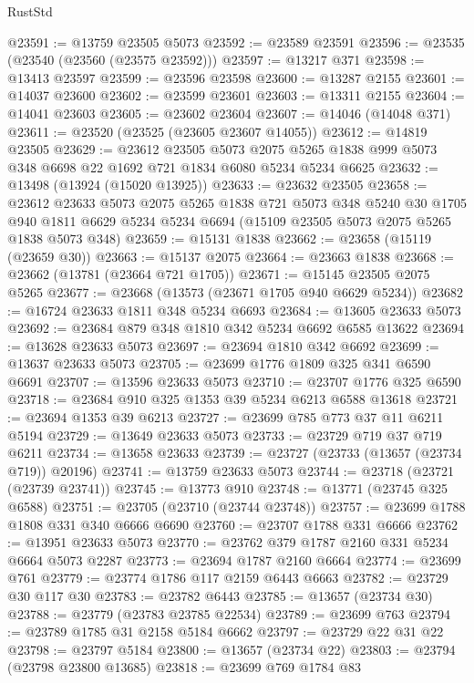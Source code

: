 \begin{lexlean}{RustStd}
\begin{coremodule}
@23591 := @13759 @23505 @5073
@23592 := @23589 @23591
@23596 := @23535 (@23540 (@23560 (@23575 @23592)))
@23597 := @13217 @371
@23598 := @13413 @23597
@23599 := @23596 @23598
@23600 := @13287 @2155
@23601 := @14037 @23600
@23602 := @23599 @23601
@23603 := @13311 @2155
@23604 := @14041 @23603
@23605 := @23602 @23604
@23607 := @14046 (@14048 @371)
@23611 := @23520 (@23525 (@23605 @23607 @14055))
@23612 := @14819 @23505
@23629 := @23612
    @23505
    @5073
    @2075
    @5265
    @1838
    @999
    @5073
    @348
    @6698
    @22
    @1692
    @721
    @1834
    @6080
    @5234
    @5234
    @6625
@23632 := @13498 (@13924 (@15020 @13925))
@23633 := @23632 @23505
@23658 := @23612
    @23633
    @5073
    @2075
    @5265
    @1838
    @721
    @5073
    @348
    @5240
    @30
    @1705
    @940
    @1811
    @6629
    @5234
    @5234
    @6694
    (@15109 @23505 @5073 @2075 @5265 @1838 @5073 @348)
@23659 := @15131 @1838
@23662 := @23658 (@15119 (@23659 @30))
@23663 := @15137 @2075
@23664 := @23663 @1838
@23668 := @23662 (@13781 (@23664 @721 @1705))
@23671 := @15145 @23505 @2075 @5265
@23677 := @23668 (@13573 (@23671 @1705 @940 @6629 @5234))
@23682 := @16724 @23633 @1811 @348 @5234 @6693
@23684 := @13605 @23633 @5073
@23692 := @23684 @879 @348 @1810 @342 @5234 @6692 @6585 @13622
@23694 := @13628 @23633 @5073
@23697 := @23694 @1810 @342 @6692
@23699 := @13637 @23633 @5073
@23705 := @23699 @1776 @1809 @325 @341 @6590 @6691
@23707 := @13596 @23633 @5073
@23710 := @23707 @1776 @325 @6590
@23718 := @23684 @910 @325 @1353 @39 @5234 @6213 @6588 @13618
@23721 := @23694 @1353 @39 @6213
@23727 := @23699 @785 @773 @37 @11 @6211 @5194
@23729 := @13649 @23633 @5073
@23733 := @23729 @719 @37 @719 @6211
@23734 := @13658 @23633
@23739 := @23727 (@23733 (@13657 (@23734 @719)) @20196)
@23741 := @13759 @23633 @5073
@23744 := @23718 (@23721 (@23739 @23741))
@23745 := @13773 @910
@23748 := @13771 (@23745 @325 @6588)
@23751 := @23705 (@23710 (@23744 @23748))
@23757 := @23699 @1788 @1808 @331 @340 @6666 @6690
@23760 := @23707 @1788 @331 @6666
@23762 := @13951 @23633 @5073
@23770 := @23762 @379 @1787 @2160 @331 @5234 @6664 @5073 @2287
@23773 := @23694 @1787 @2160 @6664
@23774 := @23699 @761
@23779 := @23774 @1786 @117 @2159 @6443 @6663
@23782 := @23729 @30 @117 @30
@23783 := @23782 @6443
@23785 := @13657 (@23734 @30)
@23788 := @23779 (@23783 @23785 @22534)
@23789 := @23699 @763
@23794 := @23789 @1785 @31 @2158 @5184 @6662
@23797 := @23729 @22 @31 @22
@23798 := @23797 @5184
@23800 := @13657 (@23734 @22)
@23803 := @23794 (@23798 @23800 @13685)
@23818 := @23699
    @769
    @1784
    @83

\end{coremodule}
\end{lexlean}
